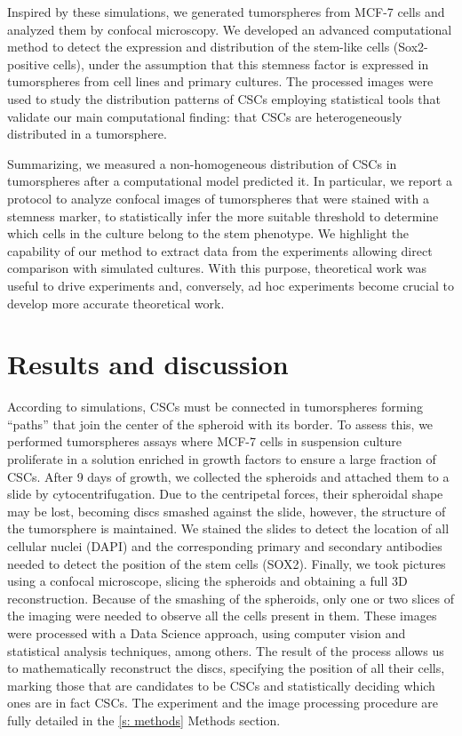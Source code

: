 \documentclass[fleqn,10pt]{wlscirep}
\begin{document}
Inspired by these simulations, we generated tumorspheres from MCF-7 cells and analyzed them by confocal microscopy.  We developed an advanced computational method to detect the expression and distribution of the stem-like cells (Sox2-positive cells), under the assumption\cite{Leis}  that this stemness factor is expressed in tumorspheres from cell lines and primary cultures. The processed images were used to study the distribution patterns of CSCs employing statistical tools that validate our main computational finding: that CSCs are heterogeneously distributed in a tumorsphere. 

Summarizing, we measured a non-homogeneous distribution of CSCs in tumorspheres after a computational model predicted it. In particular, we report a protocol to analyze confocal images of tumorspheres that were stained with a stemness marker, to statistically infer the more suitable threshold to determine which cells in the culture belong to the stem phenotype. We highlight the capability of our method to extract data from the experiments allowing direct comparison with simulated cultures. With this purpose, theoretical work was useful to drive experiments and, conversely, ad hoc experiments become crucial to develop more accurate theoretical work.      


\section*{Results and discussion} \label{s: results}
According to simulations\cite{barberis2021percolation}, CSCs must be connected in tumorspheres forming ``paths'' that join the center of the spheroid with its border. To assess this, we performed tumorspheres assays where MCF-7 cells in suspension culture proliferate in a solution enriched in growth factors to ensure a large fraction of CSCs. After 9 days of growth, we collected the spheroids and attached them to a slide by cytocentrifugation. Due to the centripetal forces, their spheroidal shape may be lost, becoming discs smashed against the slide, however, the structure of the tumorsphere is maintained. We stained the slides to detect the location of all cellular nuclei (DAPI) and the corresponding primary and secondary antibodies needed to detect the position of the stem cells (SOX2). Finally, we took pictures using a confocal microscope, slicing the spheroids and obtaining a full 3D reconstruction. Because of the smashing of the spheroids, only one or two slices of the imaging  were needed to observe all the cells present in them. These images were processed with a Data Science approach, using computer vision and statistical analysis techniques, among others. The result of the process allows us to mathematically reconstruct the discs, specifying the position of all their cells, marking those that are candidates to be CSCs and statistically deciding which ones are in fact CSCs.
The experiment and the image processing procedure are fully detailed in the \ref{s: methods} Methods section.
\end{document}
